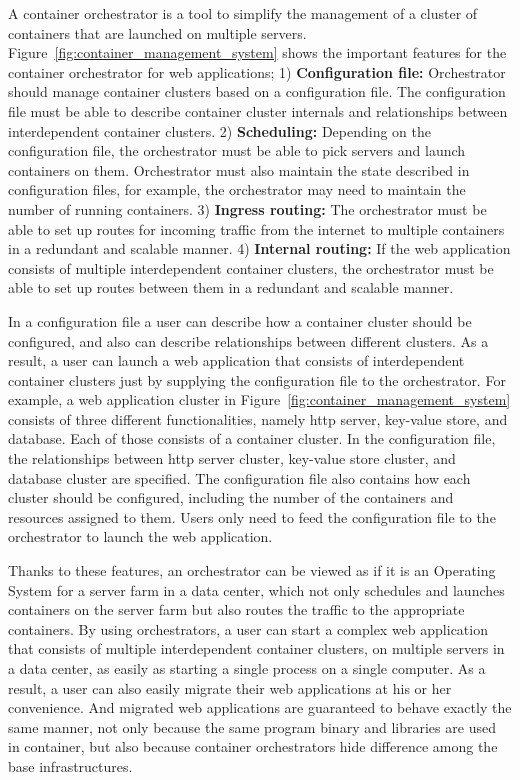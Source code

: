 A container orchestrator is a tool to simplify the management of a cluster of containers that are launched on multiple servers.
%
%
Figure~\ref{fig:container_management_system} shows the important features for the container orchestrator for web applications;
1) {\bf Configuration file:} Orchestrator should manage container clusters based on a configuration file. 
The configuration file must be able to describe container cluster internals and relationships between interdependent container clusters.
2) {\bf Scheduling:} Depending on the configuration file, the orchestrator must be able to pick servers and launch containers on them.
Orchestrator must also maintain the state described in configuration files, for example, the orchestrator may need to maintain the number of running containers.
3) {\bf Ingress routing:} The orchestrator must be able to set up routes for incoming traffic from the internet to multiple containers in a redundant and scalable manner.
4) {\bf Internal routing:} If the web application consists of multiple interdependent container clusters, the orchestrator must be able to set up routes between them in a redundant and scalable manner.

In a configuration file a user can describe how a container cluster should be configured, and also can describe relationships between different clusters.
As a result, a user can launch a web application that consists of interdependent container clusters just by supplying the configuration file to the orchestrator.
For example, a web application cluster in Figure~\ref{fig:container_management_system} consists of three different functionalities, namely http server, key-value store, and database.
Each of those consists of a container cluster.
In the configuration file, the relationships between http server cluster, key-value store cluster, and database cluster are specified.
The configuration file also contains how each cluster should be configured, including the number of the containers and resources assigned to them.
Users only need to feed the configuration file to the orchestrator to launch the web application.

Thanks to these features, an orchestrator can be viewed as if it is an Operating System for a server farm in a data center, which not only schedules and launches containers on the server farm but also routes the traffic to the appropriate containers.
By using orchestrators, a user can start a complex web application that consists of multiple interdependent container clusters, on multiple servers in a data center, as easily as starting a single process on a single computer.
As a result, a user can also easily migrate their web applications at his or her convenience.
And migrated web applications are guaranteed to behave exactly the same manner, not only because the same program binary and libraries are used in container, but also because container orchestrators hide difference among the base infrastructures.

